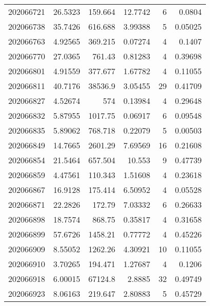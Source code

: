 \begin{tabular}{rrrrrr}
 202066721 &         26.5323  &      159.664  &           12.7742  &           6 & 0.0804  \\
 202066738 &         35.7426  &      616.688  &            3.99388 &           5 & 0.05025 \\
 202066763 &          4.92565 &      369.215  &            0.07274 &           4 & 0.1407  \\
 202066770 &         27.0365  &      761.43   &            0.81283 &           4 & 0.39698 \\
 202066801 &          4.91559 &      377.677  &            1.67782 &           4 & 0.11055 \\
 202066811 &         40.7176  &    38536.9    &            3.05455 &          29 & 0.41709 \\
 202066827 &          4.52674 &      574      &            0.13984 &           4 & 0.29648 \\
 202066832 &          5.87955 &     1017.75   &            0.06917 &           6 & 0.09548 \\
 202066835 &          5.89062 &      768.718  &            0.22079 &           5 & 0.00503 \\
 202066849 &         14.7665  &     2601.29   &            7.69569 &          16 & 0.21608 \\
 202066854 &         21.5464  &      657.504  &           10.553   &           9 & 0.47739 \\
 202066859 &          4.47561 &      110.343  &            1.51608 &           4 & 0.23618 \\
 202066867 &         16.9128  &      175.414  &            6.50952 &           4 & 0.05528 \\
 202066871 &         22.2826  &      172.79   &            7.03332 &           6 & 0.26633 \\
 202066898 &         18.7574  &      868.75   &            0.35817 &           4 & 0.31658 \\
 202066899 &         57.6726  &     1458.21   &            0.77772 &           4 & 0.45226 \\
 202066909 &          8.55052 &     1262.26   &            4.30921 &          10 & 0.11055 \\
 202066910 &          3.70265 &      194.471  &            1.27687 &           4 & 0.1206  \\
 202066918 &          6.00015 &    67124.8    &            2.8885  &          32 & 0.49749 \\
 202066923 &          8.06163 &      219.647  &            2.80883 &           5 & 0.45729 \\

\end{tabular}
